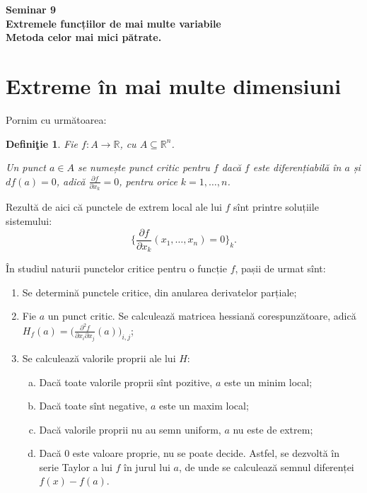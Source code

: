 \documentclass[11pt,a4paper]{article}
\newcommand\seq{\subseteq}
\newcommand\RR{\mathbb{R}}
\theoremstyle{dotless}
\theoremstyle{dotlessdr}
\newtheorem{definition}{Defini\c{t}ie}[section]
\begin{document}
\begin{center}
  {
    \large\textbf{
      Seminar 9 \\
      Extremele funcțiilor de mai multe variabile \\
      Metoda celor mai mici pătrate.
    }}
\end{center}

\vspace{1cm}

\section{Extreme în mai multe dimensiuni}
\label{sec:extreme}

Pornim cu următoarea:

\begin{definition}\label{def:p-critic}
  Fie $f : A \to \RR$, cu $A \seq \RR^n$.

  Un punct $a \in A$ se numește \emph{punct critic} pentru $f$ dacă $f$ este
  diferențiabilă în $a$ și $df(a) = 0$, adică $\frac{\partial f}{\partial x_k} = 0$,
  pentru orice $k = 1, \dots, n$.
\end{definition}

Rezultă de aici că punctele de extrem local ale lui $f$ sînt printre soluțiile
sistemului:
\[
  \Big\{ \frac{\partial f}{\partial x_k}(x_1, \dots, x_n) = 0 \Big\}_k.
\]

În studiul naturii punctelor critice pentru o funcție $f$, pașii de urmat sînt:
\begin{enumerate}[(1)]
\item Se determină punctele critice, din anularea derivatelor parțiale;
\item Fie $a$ un punct critic. Se calculează matricea hessiană corespunzătoare,
  adică $H_f(a) = \Big( \frac{\partial^2 f}{\partial x_i \partial x_j} (a) \Big)_{i,j}$;
\item Se calculează valorile proprii ale lui $H$:
  \begin{enumerate}[(a)]
  \item Dacă toate valorile proprii sînt pozitive, $a$ este un minim local;
  \item Dacă toate sînt negative, $a$ este un maxim local;
  \item Dacă valorile proprii nu au semn uniform, $a$ nu este de extrem;
  \item Dacă 0 este valoare proprie, nu se poate decide. Astfel, se dezvoltă
    în serie Taylor a lui $f$ în jurul lui $a$, de unde se calculează semnul
    diferenței $f(x) - f(a)$.
  \end{enumerate}
\end{enumerate}
\end{document}

